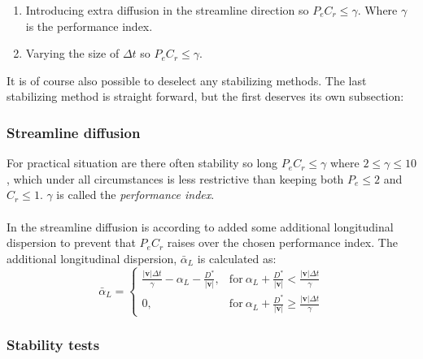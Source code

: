 \documentclass{report}
\begin{document}
\begin{enumerate}
\item Introducing extra diffusion in the streamline direction so
    $P_eC_r\leq\gamma$. Where $\gamma$ is the performance
    index. \item Varying the size of $\Delta t$ so
    $P_eC_r\leq\gamma$.
\end{enumerate}

It is of course also possible to deselect any stabilizing methods. The
last stabilizing method is straight forward, but the first deserves its
own subsection:

\subsubsection{Streamline diffusion}

For practical situation are there often stability so long $P_eC_r\leq
 \gamma$ where $2\leq \gamma \leq 10$, \cite{Perrochet}  which under all
 circumstances is less restrictive than keeping both $P_e\leq 2$ and
 $C_r\leq 1$. $\gamma$ is called the \textit{performance index}.\\
\\
In the streamline diffusion is according to \cite{Perrochet} added
some additional longitudinal dispersion to prevent that $P_eC_r$
raises over the chosen performance index. The additional
longitudinal dispersion, $\bar{\alpha}_L$ is calculated as:
%
\begin{equation}
\bar{\alpha}_L=\begin{cases} \frac{|\mathbf{v}|\Delta
    t}{\gamma}-\alpha_L-\frac{D^{*}}{|\mathbf{v}|}, & \text{for} \ \alpha_L +
    \frac{D^{*}}{|\mathbf{v}|} < \frac{|\mathbf{v}|\Delta t}{\gamma}
 \\ 0, & \text{for} \ \alpha_L +
    \frac{D^{*}}{|\mathbf{v}|} \geq \frac{|\mathbf{v}|\Delta
    t}{\gamma}\end{cases}
\end{equation}





\subsubsection{Stability tests}
\end{document}
